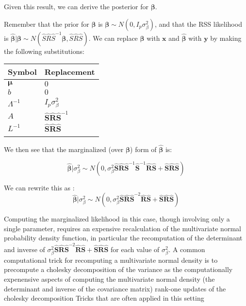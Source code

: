 Given this result, we can derive the posterior for \(\boldsymbol{\beta}\).

Remember that the prior for \(\boldsymbol{\beta}\) is \(\boldsymbol{\beta} \sim N(0,I_p\sigma^2_\beta)\), and that the RSS likelihood is \(\hat{\boldsymbol{\beta}} | \boldsymbol{\beta} \sim N(\hat{S}\hat{R}\hat{S}^{-1}\boldsymbol{\beta},\hat{S}\hat{R}\hat{S})\).  
We can replace \(\boldsymbol{\beta}\) with \(\textbf{x}\) and \(\hat{\boldsymbol{\beta}}\) with \(\textbf{y}\) by making the following substitutions:

\begin{center}
\begin{tabular}{ll}
Symbol & Replacement\\
\hline
\(\boldsymbol{\mu}\) & \(0\)\\
\(b\) & \(0\)\\
\(\Lambda^{-1}\) & \(I_p \sigma^2_\beta\)\\
\(A\) & \(\hat{\textbf{S}}\hat{\textbf{R}}\hat{\textbf{S}}^{-1}\)\\
\(L^{-1}\) & \(\hat{\textbf{S}}\hat{\textbf{R}}\hat{\textbf{S}}\)\\
 & \\
\end{tabular}
\end{center}

We then see that the marginalized (over $\boldsymbol{\beta}$) form of \(\hat{\boldsymbol{\beta}}\) is:

$$ \hat{\boldsymbol{\beta}}|\sigma_\beta^2 \sim N(0,\sigma_\beta^2\hat{\textbf{S}}\hat{\textbf{R}}\hat{\textbf{S}}^{-1}\hat{\textbf{S}}^{-1}\hat{\textbf{R}}\hat{\textbf{S}}+\hat{\textbf{S}}\hat{\textbf{R}}\hat{\textbf{S}})$$ 

We can rewrite this as :
$$\hat{\boldsymbol{\beta}}|\sigma_\beta^2 \sim  N(0,\sigma_\beta^2\hat{\textbf{S}}\hat{\textbf{R}}\hat{\textbf{S}}^{-2}\hat{\textbf{R}}\hat{\textbf{S}}+\hat{\textbf{S}}\hat{\textbf{R}}\hat{\textbf{S}}) $$

Computing the marginalized likelihood in this case, though involving only a single parameter, requires an expensive recalculation of the multivariate normal probability density function, in particular 
the recomputation of the determinant and inverse of \(\sigma_\beta^2\hat{\textbf{S}}\hat{\textbf{R}}\hat{\textbf{S}}^{-2}\hat{\textbf{R}}\hat{\textbf{S}}+\hat{\textbf{S}}\hat{\textbf{R}}\hat{\textbf{S}}\) for each value of 
\(\sigma_\beta^2\).  A common computational trick for recomputing a multivariate normal density is to precompute a cholesky decomposition of the variance as the computationally expenensive aspects of computing the multivariate normal density
(the determinant and inverse of the covariance matrix) rank-one updates of the cholesky decomposition    Tricks that are often applied in this setting



